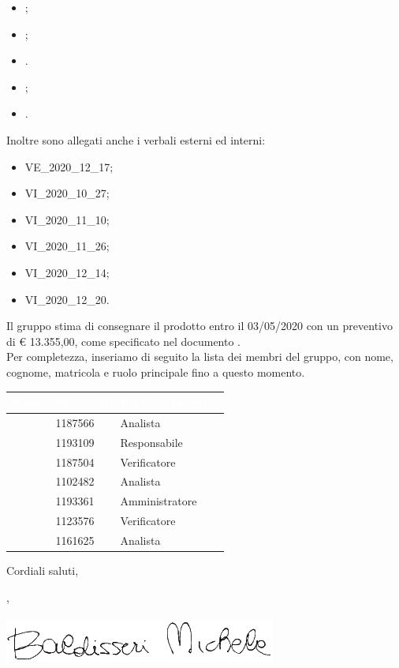 \documentclass[11pt]{letter}
\begin{document}
\begin{letter}
\begin{itemize}
            \item {};
            \item {};
            \item {}.
            \item {};
            \item {}.
        \end{itemize}
        Inoltre sono allegati anche i verbali esterni ed interni:
        \begin{itemize}
            \item VE\_2020\_12\_17;
            \item VI\_2020\_10\_27;
            \item VI\_2020\_11\_10;
            \item VI\_2020\_11\_26;
            \item VI\_2020\_12\_14;
            \item VI\_2020\_12\_20.
        \end{itemize}
        Il gruppo stima di consegnare il prodotto entro il 03/05/2020 con un preventivo di \euro{} 13.355,00, come specificato nel documento .\\
        Per completezza, inseriamo di seguito la lista dei membri del gruppo, con nome, cognome, matricola e ruolo principale fino a questo momento.
        {
            \renewcommand{\arraystretch}{2}
            \begin{longtable}{ C{4cm} C{4cm} C{4cm}}
                \textcolor{white}{\textbf{Nome}} & \textcolor{white}{\textbf{Matricola}} & \textcolor{white}{\textbf{Ruolo di progetto}}\\
                \endhead 
                \SG{} & 1187566 & Analista \\
                \BM{} & 1193109 & Responsabile \\
                \RA{} & 1187504 & Verificatore \\
                \SH{} & 1102482 & Analista \\
                \PA{} & 1193361 & Amministratore \\
                \ZM{} & 1123576 & Verificatore \\
                \SP{} & 1161625 & Analista \\
            \end{longtable}
        }
        Cordiali saluti,
        \begin{flushright}
        	\closing{\BM{}, \\ \textit{\Responsabile{}} \\\includegraphics[width=.6\linewidth]{Utility/Images/firmaBM.png}} 
        \end{flushright}
    \end{letter}
\end{document}
